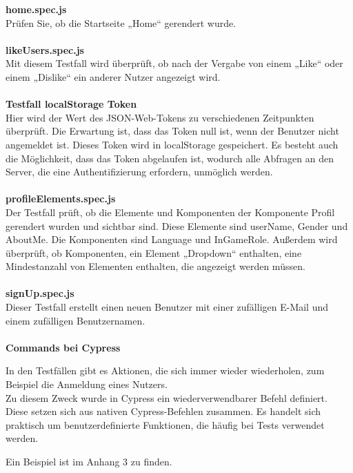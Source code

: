 \newpage
\textbf{home.spec.js}\\
Prüfen Sie, ob die Startseite „Home“ gerendert wurde.
\\\\
\textbf{likeUsers.spec.js}\\
Mit diesem Testfall wird überprüft, ob nach der Vergabe von einem „Like“ oder einem „Dislike“ ein anderer Nutzer angezeigt wird.
\\\\
\textbf{Testfall localStorage Token}\\
Hier wird der Wert des JSON-Web-Tokens zu verschiedenen Zeitpunkten überprüft.
Die Erwartung ist, dass das Token null ist, wenn der Benutzer nicht angemeldet ist.
Dieses Token wird in localStorage gespeichert.
Es besteht auch die Möglichkeit, dass das Token abgelaufen ist, wodurch alle Abfragen an den Server, die eine Authentifizierung erfordern, unmöglich werden.
\\\\
\textbf{profileElements.spec.js}\\
Der Testfall prüft, ob die Elemente und Komponenten der Komponente Profil gerendert wurden und sichtbar sind. Diese Elemente sind userName, Gender und AboutMe. Die Komponenten sind Language und InGameRole.
Außerdem wird überprüft, ob Komponenten, ein Element „Dropdown“ enthalten, eine Mindestanzahl von Elementen enthalten, die angezeigt werden müssen. 
\\\\
\textbf{signUp.spec.js}\\
Dieser Testfall erstellt einen neuen Benutzer mit einer zufälligen E-Mail und einem zufälligen Benutzernamen.  \\
\\
\textbf{Commands bei Cypress}\\
\begin{flushleft}
In den Testfällen gibt es Aktionen, die sich immer wieder wiederholen, zum Beispiel die Anmeldung eines Nutzers.
\\
Zu diesem Zweck wurde in Cypress ein wiederverwendbarer Befehl definiert.
\\
Diese setzen sich aus nativen Cypress-Befehlen zusammen. Es handelt sich praktisch um benutzerdefinierte Funktionen, die häufig bei Tests verwendet werden.

Ein Beispiel ist im Anhang 3 zu finden.
\end{flushleft}

